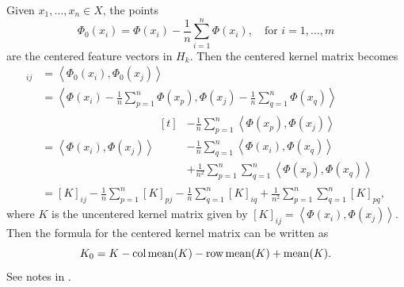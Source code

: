 Given \(x_1, \dots, x_n \in X\), the points
\begin{equation}
    \label{eqn:centered-features}
    \Phi_0(x_i) = \Phi(x_i) - \frac{1}{n} \sum_{i=1}^{n} \Phi(x_i), \quad \text{for \(i = 1,\dots,m\)}
\end{equation}
are the centered feature vectors in \(H_k\).
Then the centered kernel matrix becomes
\def\ipt#1{\left\langle #1 \right\rangle}
\begin{align*}
    [K_0]_{ij}
    &= \ipt{\Phi_0(x_i), \Phi_0(x_j)}\\
    &= \ipt{\Phi(x_i) - \frac{1}{n} \sum_{p=1}^{n} \Phi(x_p), \Phi(x_j) - \frac{1}{n} \sum_{q=1}^{n} \Phi(x_q)}\\
    &= \ipt{\Phi(x_i), \Phi(x_j)}
    \begin{aligned}[t]
        &- \frac{1}{n} \sum_{p=1}^{n} \ipt{\Phi(x_p), \Phi(x_j)}\\
        &- \frac{1}{n} \sum_{q=1}^{n} \ipt{\Phi(x_i), \Phi(x_q)}\\
        &+ \frac{1}{n^2} \sum_{p=1}^{n} \sum_{q=1}^{n} \ipt{\Phi(x_p), \Phi(x_q)}
    \end{aligned}\\
    &= [K]_{ij} - \frac{1}{n} \sum_{p=1}^{n} [K]_{pj} - \frac{1}{n} \sum_{q=1}^{n} [K]_{iq} + \frac{1}{n^2} \sum_{p=1}^{n} \sum_{q=1}^{n} [K]_{pq},
\end{align*}
where \(K\) is the uncentered kernel matrix given by \([K]_{ij} = \ipt{\Phi(x_i), \Phi(x_j)}\).
Then the formula for the centered kernel matrix can be written as
\begin{equation}
    \label{eqn:centered-kernel-matrix}
    K_0 = K - \operatorname{col\,mean}(K) - \operatorname{row\,mean}(K) + \operatorname{mean}(K).
\end{equation}
See notes in .

